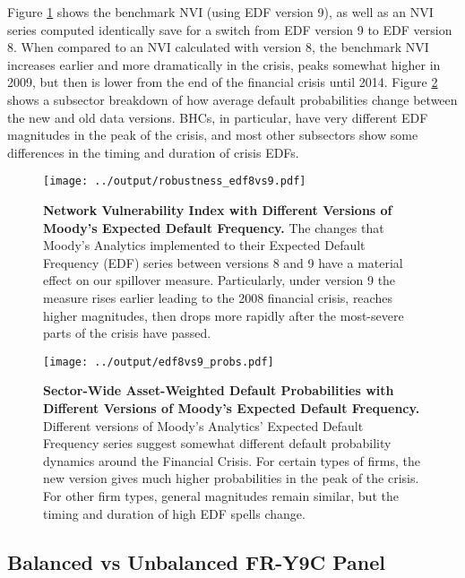 Figure \ref{fig:NVI_edf8v9} shows the benchmark NVI (using EDF version 9), as well as an NVI series computed identically save for a switch from EDF version 9 to EDF version 8. When compared to an NVI calculated with version 8, the benchmark NVI increases earlier and more dramatically in the crisis, peaks somewhat higher in 2009, but then is lower from the end of the financial crisis until 2014. Figure \ref{fig:default_prob_edf8v9} shows a subsector breakdown of how  average default probabilities change between the new and old data versions. BHCs, in particular, have very different EDF magnitudes in the peak of the crisis, and most other subsectors show some differences in the timing and duration of crisis EDFs.  

\begin{figure}[H]
\begin{center}
\texttt{[image: ../output/robustness\_edf8vs9.pdf]} 
\end{center}
\caption[]{\textbf{Network Vulnerability Index with Different Versions of Moody's Expected Default Frequency.} The changes that Moody's Analytics implemented to their Expected Default Frequency (EDF) series between versions 8 and 9 have a material effect on our spillover measure. Particularly, under version 9 the measure rises earlier leading to the 2008 financial crisis, reaches higher magnitudes, then drops more rapidly after the most-severe parts of the crisis have passed.} \label{fig:NVI_edf8v9}
\end{figure}


\begin{figure}[H]
\begin{center}
\texttt{[image: ../output/edf8vs9\_probs.pdf]} 
\end{center}
\caption[]{\textbf{Sector-Wide Asset-Weighted Default Probabilities with Different Versions of Moody's Expected Default Frequency.} Different versions of Moody's Analytics' Expected Default Frequency series suggest somewhat different default probability dynamics around the Financial Crisis. For certain types of firms, the new version gives much higher probabilities in the peak of the crisis. For other firm types, general magnitudes remain similar, but the timing and duration of high EDF spells change.} \label{fig:default_prob_edf8v9}
\end{figure}

\subsection*{Balanced vs Unbalanced FR-Y9C Panel}

